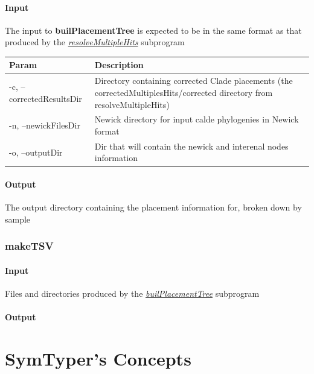 \documentclass[letterpaper,10pt,english]{sphinxmanual}
\begin{document}
\subsubsection{Input}
\label{CommandLine:id8}
The input to \textbf{builPlacementTree} is expected to be in the same format as that produced by the {\hyperref[CommandLine:resolvemultiplehits]{\emph{resolveMultipleHits}}} subprogram

\begin{tabulary}{\linewidth}{|L|L|}
\hline
\textsf{\relax 
Param
} & \textsf{\relax 
Description
}\\
\hline
-c, --correctedResultsDir
 & 
Directory containing corrected Clade placements (the correctedMultiplesHits/corrected directory from resolveMultipleHits)
\\

-n, --newickFilesDir
 & 
Newick directory for input calde phylogenies in Newick format
\\

-o, --outputDir
 & 
Dir that will contain the newick and interenal nodes information
\\
\hline\end{tabulary}



\subsubsection{Output}
\label{CommandLine:id9}
The output directory containing the placement information for, broken down by sample


\subsection{makeTSV}
\label{CommandLine:id10}\label{CommandLine:maketsv}

\subsubsection{Input}
\label{CommandLine:id11}
Files and directories produced by the {\hyperref[CommandLine:builplacementtree]{\emph{builPlacementTree}}} subprogram


\subsubsection{Output}
\label{CommandLine:id12}

\chapter{SymTyper's Concepts}
\label{defs::doc}\label{defs:symtyper-s-concepts}
\end{document}
